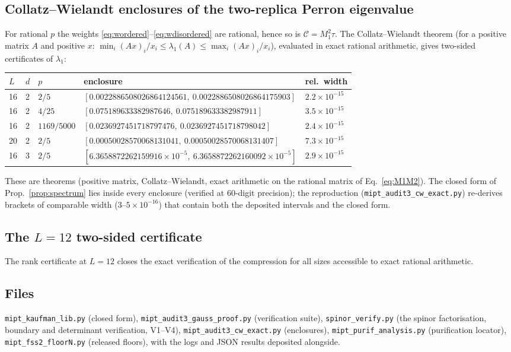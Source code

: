 \documentclass[11pt]{article}
\newcommand{\Ccomp}{\mathcal{C}}
\begin{document}
\subsection{Collatz--Wielandt enclosures of the two-replica Perron
eigenvalue}\label{app:enclosures}
For rational $p$ the weights \eqref{eq:wordered}--\eqref{eq:wdisordered} are
rational, hence so is $\Ccomp=M_1^2\tau$.  The Collatz--Wielandt theorem
(for a positive matrix $A$ and positive $x$:
$\min_i(Ax)_i/x_i\le\lambda_1(A)\le\max_i(Ax)_i/x_i$), evaluated in exact
rational arithmetic, gives two-sided certificates of $\lambda_1$:
\begin{center}
\begin{tabular}{lllll}
\toprule
$L$ & $d$ & $p$ & enclosure & rel.\ width\\
\midrule
16 & 2 & $2/5$       & $[0.0022886508026864124561,\ 0.0022886508026864175903]$ & $2.2\times10^{-15}$\\
16 & 2 & $4/25$      & $[0.075189633382987646,\    0.075189633382987911]$     & $3.5\times10^{-15}$\\
16 & 2 & $1169/5000$ & $[0.0236927451718797476,\   0.0236927451718798042]$    & $2.4\times10^{-15}$\\
20 & 2 & $2/5$       & $[0.00050028570068131041,\  0.00050028570068131407]$    & $7.3\times10^{-15}$\\
16 & 3 & $2/5$       & $[6.3658872262159916{\times}10^{-5},\ 6.3658872262160092{\times}10^{-5}]$ & $2.9\times10^{-15}$\\
\bottomrule
\end{tabular}
\end{center}
These are theorems (positive matrix, Collatz--Wielandt, exact arithmetic on
the rational matrix of Eq.~\eqref{eq:M1M2}).  The closed form of
Prop.~\ref{prop:spectrum} lies inside every enclosure (verified at
$60$-digit precision); the reproduction
(\texttt{mipt\_audit3\_cw\_exact.py}) re-derives brackets of comparable
width ($3$--$5\times10^{-16}$) that contain both the deposited intervals and
the closed form.

\subsection{The $L=12$ two-sided certificate}\label{app:L12}
The rank certificate at $L=12$ closes the exact verification of the
compression for all sizes accessible to exact rational arithmetic.

\subsection{Files}\label{app:files}
\texttt{mipt\_kaufman\_lib.py} (closed form),
\texttt{mipt\_audit3\_gauss\_proof.py} (verification suite),
\texttt{spinor\_verify.py} (the spinor factorisation, boundary and
determinant verification, V1--V4),
\texttt{mipt\_audit3\_cw\_exact.py} (enclosures),
\texttt{mipt\_purif\_analysis.py} (purification locator),
\texttt{mipt\_fss2\_floorN.py} (released floors), with the logs and JSON
results deposited alongside.
\end{document}
